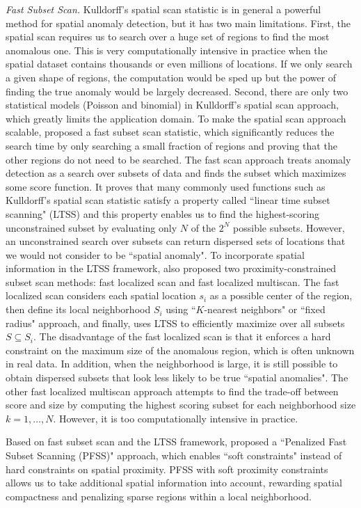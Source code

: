\documentclass[11pt]{article}
\begin{document}
\textit{Fast Subset Scan.}
Kulldorff's spatial scan statistic is in general a powerful method for spatial anomaly detection, but it has two main limitations. First, the spatial scan requires us to search over a huge set of regions to find the most anomalous one. This is very computationally intensive in practice when the spatial dataset contains thousands or even millions of locations. If we only search a given shape of regions, the computation would be sped up but the power of finding the true anomaly would be largely decreased. Second, there are only two statistical models (Poisson and binomial) in Kulldorff's spatial scan approach, which greatly limits the application domain. To make the spatial scan approach scalable, \citet{neill2012fast} proposed a fast subset scan statistic, which significantly reduces the search time by only searching a small fraction of regions and proving that the other regions do not need to be searched. The fast scan approach treats anomaly detection as a search over subsets of data and finds the subset which maximizes some score function. It proves that many commonly used functions such as Kulldorff's spatial scan statistic satisfy a property called ``linear time subset scanning" (LTSS) and this property enables us to find the highest-scoring unconstrained subset by evaluating only $N$ of the $2^N$ possible subsets. However, an unconstrained search over subsets can return dispersed sets of locations that we would not consider to be ``spatial anomaly". To incorporate spatial information in the LTSS framework, \citet{neill2012fast} also proposed two proximity-constrained subset scan methods: fast localized scan and fast localized multiscan. The fast localized scan considers each spatial location $s_i$ as a possible center of the region, then define its local neighborhood $S_i$ using ``$K$-nearest neighbors" or ``fixed radius" approach, and finally, uses LTSS to efficiently maximize over all subsets $S\subseteq S_i$. The disadvantage of the fast localized scan is that it enforces a hard constraint on the maximum size of the anomalous region, which is often unknown in real data. In addition, when the neighborhood is large, it is still possible to obtain dispersed subsets that look less likely to be true ``spatial anomalies". The other fast localized multiscan approach attempts to find the trade-off between score and size by computing the highest scoring subset for each neighborhood size $k=1,\ldots, N$. However, it is too computationally intensive in practice. 

Based on fast subset scan and the LTSS framework,\citet{speakman2016penalized} proposed a ``Penalized Fast Subset Scanning (PFSS)" approach, which enables ``soft constraints" instead of hard constraints on spatial proximity. PFSS with soft proximity constraints allows us to take additional spatial information into account, rewarding spatial compactness and penalizing sparse regions within a local neighborhood.
\end{document}
